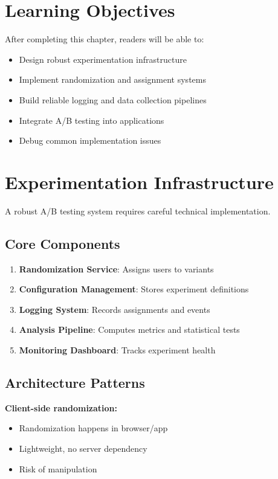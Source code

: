 \section{Learning Objectives}

After completing this chapter, readers will be able to:
\begin{itemize}
    \item Design robust experimentation infrastructure
    \item Implement randomization and assignment systems
    \item Build reliable logging and data collection pipelines
    \item Integrate A/B testing into applications
    \item Debug common implementation issues
\end{itemize}

\section{Experimentation Infrastructure}

A robust A/B testing system requires careful technical implementation.

\subsection{Core Components}

\begin{enumerate}
    \item \textbf{Randomization Service}: Assigns users to variants
    \item \textbf{Configuration Management}: Stores experiment definitions
    \item \textbf{Logging System}: Records assignments and events
    \item \textbf{Analysis Pipeline}: Computes metrics and statistical tests
    \item \textbf{Monitoring Dashboard}: Tracks experiment health
\end{enumerate}

\subsection{Architecture Patterns}

\textbf{Client-side randomization:}
\begin{itemize}
    \item Randomization happens in browser/app
    \item Lightweight, no server dependency
    \item Risk of manipulation
\end{itemize}

